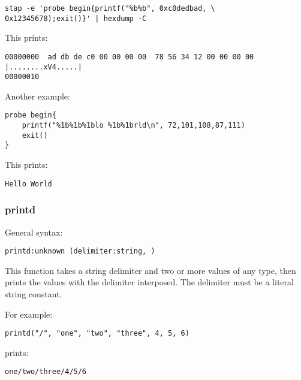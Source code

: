 \documentclass[twoside,english]{article}
\newenvironment{vindent}
{\begin{list}{}{\setlength{\listparindent}{6pt}}
\item[]}
{\end{list}}
\begin{document}
\begin{vindent}
\begin{verbatim}
stap -e 'probe begin{printf("%b%b", 0xc0dedbad, \
0x12345678);exit()}' | hexdump -C

\end{verbatim}
\end{vindent}
This prints:

\begin{vindent}
\begin{verbatim}
00000000  ad db de c0 00 00 00 00  78 56 34 12 00 00 00 00  |........xV4.....|
00000010
\end{verbatim}
\end{vindent}
Another example:

\begin{vindent}
\begin{verbatim}
probe begin{
    printf("%1b%1b%1blo %1b%1brld\n", 72,101,108,87,111)
    exit()
}
\end{verbatim}
\end{vindent}
This prints:

\begin{vindent}
\begin{verbatim}
Hello World
\end{verbatim}
\end{vindent}

\subsubsection{printd}
General syntax:

\begin{vindent}
\begin{verbatim}
printd:unknown (delimiter:string, )
\end{verbatim}
\end{vindent}
This function takes a string delimiter and two or more values of any type, then
prints the values with the delimiter interposed. The delimiter must be a
literal string constant.

For example:
\begin{vindent}
\begin{verbatim}
printd("/", "one", "two", "three", 4, 5, 6)
\end{verbatim}
\end{vindent}
prints:
\begin{vindent}
\begin{verbatim}
one/two/three/4/5/6
\end{verbatim}
\end{vindent}
\end{document}
